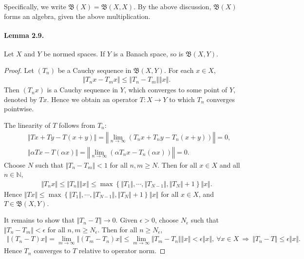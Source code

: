 \documentclass{article}
\begin{document}
Specifically, we write $\mathfrak{B}(X)=\mathfrak{B}(X,X)$. By the above discussion, $\mathfrak{B}(X)$ forms an algebra, given the above multiplication.

\paragraph{Lemma 2.9.\label{lemma:2.9}} Let $X$ and $Y$ be normed spaces. If $Y$ is a Banach space, so is $\mathfrak{B}(X,Y)$.
\begin{proof}
Let $(T_n)$ be a Cauchy sequence in $\mathfrak{B}(X,Y)$. For each $x\in X$, 
\begin{align*}
	\Vert T_n x - T_m x\Vert \leq \left\Vert T_n - T_m\right\Vert \left\Vert x\right\Vert.
\end{align*}
Then $(T_n x)$ is a Cauchy sequence in $Y$, which converges to some point of $Y$, denoted by $Tx$. Hence we obtain an operator $T:X\to Y$ to which $T_n$ converges pointwise.
\vspace{0.1cm}

The linearity of $T$ follows from $T_n$:
\begin{align*}
	&\Vert Tx + Ty - T(x+y)\Vert = \left\Vert \lim_{n\to\infty} \left(T_nx + T_ny - T_n(x+y)\right)\right\Vert = 0,\\
	&\Vert \alpha Tx - T(\alpha x)\Vert = \left\Vert \lim_{n\to\infty} \left(\alpha T_n x - T_n(\alpha x)\right)\right\Vert = 0.
\end{align*}
Choose $N$ such that $\Vert T_n - T_m\Vert < 1$ for all $n,m\geq N$. Then for all $x\in X$ and all $n\in\mathbb{N}$,
\begin{align*}
\Vert T_n x\Vert \leq \Vert T_n\Vert\left\Vert x\right\Vert \leq\max\left\{\Vert T_1\Vert,\cdots,\Vert T_{N-1}\Vert,\Vert T_N\Vert + 1\right\}\Vert x\Vert.
\end{align*}
Hence $\Vert Tx\Vert \leq \max\left\{\Vert T_1\Vert,\cdots,\Vert T_{N-1}\Vert,\Vert T_N\Vert + 1\right\}\Vert x\Vert$ for all $x\in X$, and $T\in\mathfrak{B}(X,Y)$.
\vspace{0.1cm}

It remains to show that $\Vert T_n - T\Vert\to 0$. Given $\epsilon>0$, choose $N_\epsilon$ such that $\Vert T_n-T_m\Vert < \epsilon$ for all $n,m\geq N_\epsilon$. Then for all $n\geq N_\epsilon$,
\begin{align*}
	\Vert (T_n - T)x\Vert = \lim_{m\to\infty}\Vert (T_m - T_n)x\Vert \leq  \lim_{m\to\infty}\Vert T_m - T_n\Vert\left\Vert x\right\Vert < \epsilon\Vert x\Vert,\ \forall x\in X\ \Rightarrow\ \Vert T_n-T\Vert \leq \epsilon\Vert x\Vert.
\end{align*}
Hence $T_n$ converges to $T$ relative to operator norm.
\end{proof}
\end{document}
